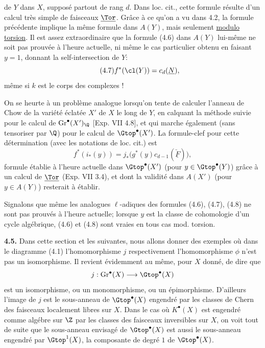 
de $Y$
dans $X$, supposé partout de rang $d$. Dans loc. cit., cette formule résulte d'un calcul très simple de faisceaux $\underline{\Tor}$. Grâce à ce qu'on a vu dans 4.2, la formule précédente implique la même formule dans $A(Y)$, mais seulement \uline{modulo torsion}. Il est assez extraordinaire que la formule (4.6) dans $A(Y)$ lui-même ne soit pas prouvée à l'heure actuelle, ni même le cas particulier obtenu en faisant $y=1$, donnant la self-intersection de $Y$:
\begin{equation}\tag{4.7}
 f^*(\cl(Y))=c_d(\underline{N}),
\end{equation}
même si $k$ est le corps des complexes !

On se heurte à un problème analogue lorsqu'on tente de calculer l'anneau de Chow de la variété éclatée $X'$ de $X$ le long de $Y$, en calquant la méthode suivie pour le calcul de $\operatorname{Gr}^\bullet(X')_\Q$ [Exp. VII 4.8], et qui marche également (sans tensoriser par $\Q$) pour le calcul de $\Gtop^\bullet(X')$. La formule-clef pour cette détermination (avec les notations de loc. cit.) est
\begin{equation}\tag{4.8}
 f^*(i_*(y))=j_*\bigl(g^*(y)c_{d-1}(\check{\underline F})\bigr),
\end{equation}
formule établie à l'heure actuelle dans $\Gtop^\bullet(X')$ (pour $y\in\Gtop^\bullet(Y)$) grâce à un calcul de $\underline{\Tor}$ (Exp. VII 3.4), et dont la validité dans $A(X')$ (pour $y\in A(Y)$) resterait à établir.

Signalons que même les analogues $\ell$-adiques des formules (4.6), (4.7), (4.8) ne sont pas prouvés à l'heure actuelle; lorsque $y$ est la classe de cohomologie d'un cycle algébrique, (4.6) et (4.8) sont vraies en tous cas mod. torsion.

\textbf{4.5.} Dans cette section et les suivantes, nous allons donner des exemples où dans le diagramme (4.1) l'homomorphisme $j$ respectivement l'homomorphisme $\phi$ n'est pas un isomorphisme. Il revient évidemment au même, pour $X$ donné, de dire que
\[
 j:\operatorname{Gr}^\bullet(X)\longrightarrow \Gtop^\bullet(X)
\]
est un isomorphisme, ou un monomorphisme, ou un épimorphisme. D'ailleurs l'image de $j$ est le sous-anneau de $\Gtop^\bullet(X)$ engendré par les classes de Chern des faisceaux localement libres sur $X$. Dans le cas où $K^\bullet(X)$ est engendré comme algébre sur $\Z$ par les classes des faisceaux inversibles sur $X$, on voit tout de suite que le sous-anneau envisagé de $\Gtop^\bullet(X)$ est aussi le sous-anneau engendré par $\Gtop^1(X)$, la composante de degré $1$ de $\Gtop^\bullet(X)$.
